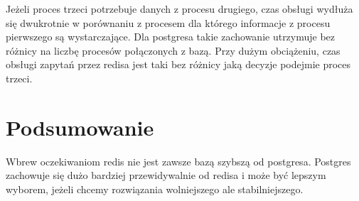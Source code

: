 \documentclass[10pt]{article}
\begin{document}
Jeżeli proces trzeci potrzebuje danych z procesu drugiego, czas obsługi wydłuża się dwukrotnie w porównaniu z procesem dla którego informacje z procesu pierwszego są wystarczające. Dla postgresa takie zachowanie utrzymuje bez różnicy na liczbę procesów połączonych z bazą. Przy dużym obciążeniu, czas obsługi zapytań przez redisa jest taki bez różnicy jaką decyzje podejmie proces trzeci.

\section*{Podsumowanie}
Wbrew oczekiwaniom redis nie jest zawsze bazą szybszą od postgresa. Postgres zachowuje się dużo bardziej przewidywalnie od redisa i może być lepszym wyborem, jeżeli chcemy rozwiązania wolniejszego ale stabilniejszego.
\end{document}
